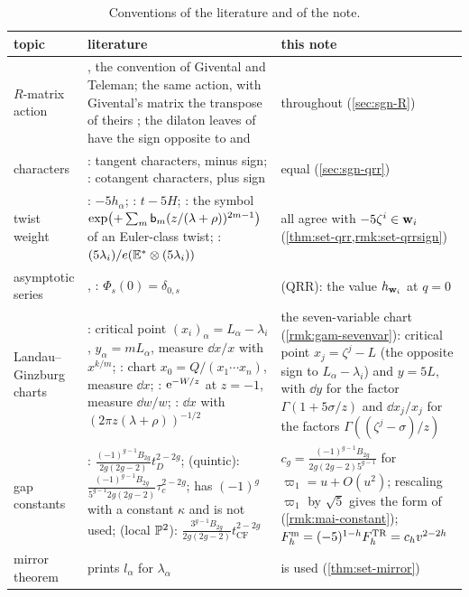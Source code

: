 \begin{table}[ht]
\caption{Conventions of the literature and of the note.}
\label{tab:sgn-lit}
\centering
\footnotesize
\renewcommand{\arraystretch}{1.2}
\begin{tabular}{@{}>{\raggedright\arraybackslash}p{}>{\raggedright\arraybackslash}p{}>{\raggedright\arraybackslash}p{}@{}}
\hline
topic & literature & this note \\
\hline
$R$-matrix action & \cite[Def.~2.2]{PPZ15}, the convention of Givental and Teleman; \cite[\S2.3]{Dunin-Barkowski:2015caa} the same action, with Givental's matrix the transpose of theirs \cite[Remark~2.1]{Dunin-Barkowski:2015caa}; the dilaton leaves of \cite[\S2.3]{Dunin-Barkowski:2015caa} have the sign opposite to \cite[Def.~2.13]{PPZ15} and \cite[\S2.3]{DuninBarkowski:2012bw} & \cite{PPZ15} throughout (\cref{sec:sgn-R}) \\
characters & \cite[\S2.2, Theorem~1]{Giv01}: tangent characters, minus sign; \cite[9.1~Theorem]{MR1901075}: cotangent characters, plus sign & equal (\cref{sec:sgn-qrr}) \\
twist weight & \cite[(17)]{GJR18}: $-5h_\alpha$; \cite[(20)]{GJR17}: $t-5H$; \cite[Corollary~1]{MR2276766}: the symbol $\exp\bigl(+\sum_m\mathsf{b}_m(z/(\lambda+\rho))^{2m-1}\bigr)$ of an Euler-class twist; \cite[(26)]{LP20}: $(5\lambda_i)/e(\mathbb E^*\otimes(5\lambda_i))$ & all agree with $-5\zeta^i\in\mathbf{w}_i$ (\cref{thm:set-qrr,rmk:set-qrrsign}) \\
asymptotic series & \cite[Theorem~4 (i)]{ZZ08}, \cite[\S2.4.4, (18)]{LP20}: $\Phi_s(0)=\delta_{0,s}$ & (QRR): the value $h_{\mathbf{w}_i}$ at $q=0$ \\
Landau--Ginzburg charts & \cite[\S7, Remark~7.2]{GJR18}: critical point $(x_i)_\alpha=L_\alpha-\lambda_i$, $y_\alpha=mL_\alpha$, measure $\dd x/x$ with $x^{k/m}$; \cite[\S10]{MR1901075}: chart $x_0=Q/(x_1\cdots x_n)$, measure $\dd x$; \cite[Lemma~4.20]{MR2553377}: $\mathrm{e}^{-W/z}$ at $z=-1$, measure $\dd w/w$; \cite[\S7, (11)]{MR2276766}: $\dd x$ with $(2\pi z(\lambda+\rho))^{-1/2}$ & the seven-variable chart (\cref{rmk:gam-sevenvar}): critical point $x_j=\zeta^j-L$ (the opposite sign to $L_\alpha-\lambda_i$) and $y=5L$, with $\dd y$ for the factor $\Gamma(1+5\sigma/z)$ and $\dd x_j/x_j$ for the factors $\Gamma((\zeta^j-\sigma)/z)$ \\
gap constants & \cite[(1.2)]{HKQ09}: $\frac{(-1)^{g-1}B_{2g}}{2g(2g-2)}t_D^{2-2g}$; \cite[Conjecture~1.5]{CGYZ26} (quintic): $\frac{(-1)^{g-1}B_{2g}}{5^{g-1}2g(2g-2)}\tau_c^{2-2g}$; \cite[Definition~1.8]{CGYZ26} has $(-1)^g$ with a constant $\kappa$ and is not used; \cite[(1.5)]{Br25} (local $\mathbb{P}^2$): $\frac{3^{g-1}B_{2g}}{2g(2g-2)}t_{\mathrm{CF}}^{2-2g}$ & $c_g=\frac{(-1)^{g-1}B_{2g}}{2g(2g-2)5^{g-1}}$ for $\varpi_1=u+O(u^2)$; rescaling $\varpi_1$ by $\sqrt5$ gives the form of \cite[(1.2)]{HKQ09} (\cref{rmk:mai-constant}); $F^{\mathrm{m}}_h=(-5)^{1-h}F^{\mathrm{TR}}_h=c_hv^{2-2h}$ \\
mirror theorem & \cite[Corollary~11.7]{MR1408320} prints $l_\alpha$ for $\lambda_\alpha$ & \cite[Theorem~11.6]{MR1408320} is used (\cref{thm:set-mirror}) \\
\hline
\end{tabular}
\end{table}
